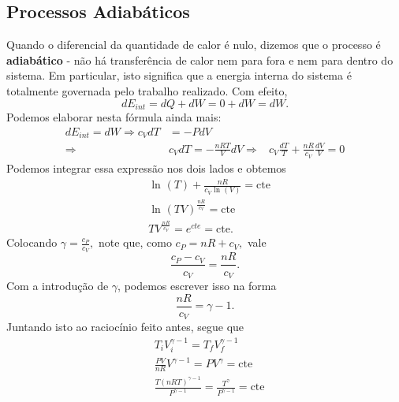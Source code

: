 \documentclass[phsyicsII_notes.tex]{subfiles}
\begin{document}
\subsection{Processos Adiabáticos}
Quando o diferencial da quantidade de calor é nulo, dizemos que o processo é \textbf{adiabático} - não há transferência
de calor nem para fora e nem para dentro do sistema. Em particular, isto significa que a energia interna do sistema é totalmente
governada pelo trabalho realizado. Com efeito,
\[
	dE_{int} = dQ + dW = 0 + dW = dW.
\]
Podemos elaborar nesta fórmula ainda mais:
\begin{align*}
	dE_{int} = dW \Rightarrow c_{V}dT & = - PdV                                              \\
	\Rightarrow                       & c_{V}dT = -\frac{nRT}{V}dV
	\Rightarrow                       & c_{V}\frac{dT}{T} + \frac{nR}{c_{V}}\frac{dV}{V} = 0
\end{align*}
Podemos integrar essa expressão nos dois lados e obtemos
\begin{align*}
	 & \ln^{}{(T)} + \frac{nR}{c_{V}\ln^{}{(V)}} = \mathrm{cte} \\
	 & \ln^{}{(TV)^{\frac{nR}{c_{V}}}} = \mathrm{cte}           \\
	 & TV^{\frac{nR}{c_{V}}} = e^{cte} = \mathrm{cte}.
\end{align*}
Colocando \(\gamma  = \frac{c_{P}}{c_{V}},\) note que, como \(c_{P} = nR + c_{V},\) vale
\[
	\frac{c_{P}-c_{V}}{c_{V}} = \frac{nR}{c_{V}}.
\]
Com a introdução de \(\gamma \), podemos escrever isso na forma
\[
	\frac{nR}{c_{V}} = \gamma - 1.
\]
Juntando isto ao raciocínio feito antes, segue que
\begin{align*}
	 & T_{i}V_{i}^{\gamma - 1} = T_{f}V_{f}^{\gamma - 1}                                              \\
	 & \frac{PV}{nR}V^{\gamma - 1} = PV^{\gamma } = \mathrm{cte}                                      \\
	 & \frac{T(nRT)^{\gamma - 1}}{P^{\gamma - 1}} = \frac{T^{\gamma }}{P^{\gamma - 1}} = \mathrm{cte}
\end{align*}
\end{document}
